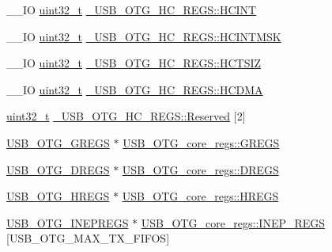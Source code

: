 \begin{DoxyCompactItemize}
\item 
\-\_\-\-\_\-\-I\-O \hyperlink{stdint_8h_a435d1572bf3f880d55459d9805097f62}{uint32\-\_\-t} \hyperlink{group___u_s_b___o_t_g___d_r_i_v_e_r_ga10ac581956332a3dca2b9ba7ea05230f}{\-\_\-\-U\-S\-B\-\_\-\-O\-T\-G\-\_\-\-H\-C\-\_\-\-R\-E\-G\-S\-::\-H\-C\-I\-N\-T}
\item 
\-\_\-\-\_\-\-I\-O \hyperlink{stdint_8h_a435d1572bf3f880d55459d9805097f62}{uint32\-\_\-t} \hyperlink{group___u_s_b___o_t_g___d_r_i_v_e_r_ga2dbe5f6d3aa6e195d2aaeb0bc2065d24}{\-\_\-\-U\-S\-B\-\_\-\-O\-T\-G\-\_\-\-H\-C\-\_\-\-R\-E\-G\-S\-::\-H\-C\-I\-N\-T\-M\-S\-K}
\item 
\-\_\-\-\_\-\-I\-O \hyperlink{stdint_8h_a435d1572bf3f880d55459d9805097f62}{uint32\-\_\-t} \hyperlink{group___u_s_b___o_t_g___d_r_i_v_e_r_gaece38f0014a78ca60398f474dea5a3d0}{\-\_\-\-U\-S\-B\-\_\-\-O\-T\-G\-\_\-\-H\-C\-\_\-\-R\-E\-G\-S\-::\-H\-C\-T\-S\-I\-Z}
\item 
\-\_\-\-\_\-\-I\-O \hyperlink{stdint_8h_a435d1572bf3f880d55459d9805097f62}{uint32\-\_\-t} \hyperlink{group___u_s_b___o_t_g___d_r_i_v_e_r_ga31e582ea1e15069538505cfcfa13f9f2}{\-\_\-\-U\-S\-B\-\_\-\-O\-T\-G\-\_\-\-H\-C\-\_\-\-R\-E\-G\-S\-::\-H\-C\-D\-M\-A}
\item 
\hyperlink{stdint_8h_a435d1572bf3f880d55459d9805097f62}{uint32\-\_\-t} \hyperlink{group___u_s_b___o_t_g___d_r_i_v_e_r_ga86ff2db88b93c1f102a1cfabc608c2ab}{\-\_\-\-U\-S\-B\-\_\-\-O\-T\-G\-\_\-\-H\-C\-\_\-\-R\-E\-G\-S\-::\-Reserved} \mbox{[}2\mbox{]}
\item 
\hyperlink{group_______u_s_b___o_t_g___core__register_ga726f86373d99c6ac3a1d9eff0f08d96e}{U\-S\-B\-\_\-\-O\-T\-G\-\_\-\-G\-R\-E\-G\-S} $\ast$ \hyperlink{group___u_s_b___o_t_g___d_r_i_v_e_r_gacc851a3b405cd504963dc080bea312b6}{U\-S\-B\-\_\-\-O\-T\-G\-\_\-core\-\_\-regs\-::\-G\-R\-E\-G\-S}
\item 
\hyperlink{group______device___registers_gad6421c23a43e84eb179f543a1cd3c04c}{U\-S\-B\-\_\-\-O\-T\-G\-\_\-\-D\-R\-E\-G\-S} $\ast$ \hyperlink{group___u_s_b___o_t_g___d_r_i_v_e_r_ga35f5af507074b23c0c181f6f7a6a7c19}{U\-S\-B\-\_\-\-O\-T\-G\-\_\-core\-\_\-regs\-::\-D\-R\-E\-G\-S}
\item 
\hyperlink{group_______host___mode___register___structures_ga5857dffb767c8009dc294a308941d078}{U\-S\-B\-\_\-\-O\-T\-G\-\_\-\-H\-R\-E\-G\-S} $\ast$ \hyperlink{group___u_s_b___o_t_g___d_r_i_v_e_r_ga7497119e5a74fdef8ec73e62ffa9f689}{U\-S\-B\-\_\-\-O\-T\-G\-\_\-core\-\_\-regs\-::\-H\-R\-E\-G\-S}
\item 
\hyperlink{group_______i_n___endpoint-_specific___register_ga31786dae3bf9816d3e69f67559bb1499}{U\-S\-B\-\_\-\-O\-T\-G\-\_\-\-I\-N\-E\-P\-R\-E\-G\-S} $\ast$ \hyperlink{group___u_s_b___o_t_g___d_r_i_v_e_r_ga4a6860a408abdfef555d0e4d036375cf}{U\-S\-B\-\_\-\-O\-T\-G\-\_\-core\-\_\-regs\-::\-I\-N\-E\-P\-\_\-\-R\-E\-G\-S} \mbox{[}U\-S\-B\-\_\-\-O\-T\-G\-\_\-\-M\-A\-X\-\_\-\-T\-X\-\_\-\-F\-I\-F\-O\-S\mbox{]}

\end{DoxyCompactItemize}
